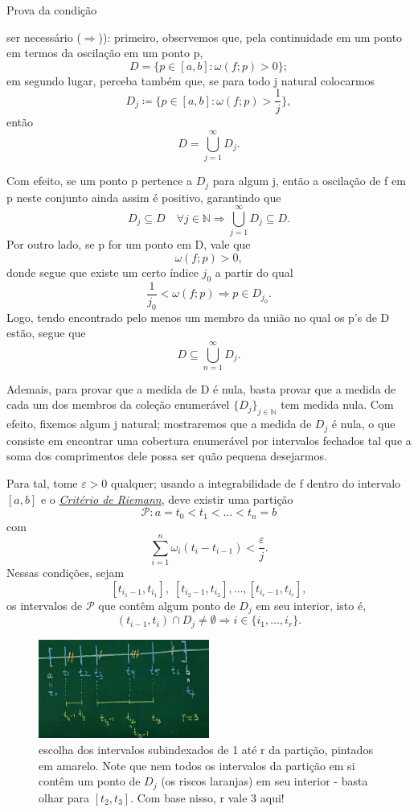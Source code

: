 \documentclass[../analysisII_notes.tex]{subfiles}
\begin{document}
\begin{proof*}
	\hypertarget{next_class_13}{Prova da condição} ser necessário (\(\Rightarrow \))): primeiro, observemos que, pela continuidade em um ponto em termos da oscilação em um ponto p,
	\[
		D = \{p\in [a, b]: \omega(f; p)>0\};
	\]
	em segundo lugar, perceba também que, se para todo j natural colocarmos
	\[
		D_{j} \coloneqq \biggl\{p\in [a, b]: \omega (f; p) > \frac{1}{j}\biggr\},
	\]
	então
	\[
		D = \bigcup_{j=1}^{\infty}D_{j}.
	\]

	Com efeito, se um ponto p pertence a \(D_{j}\) para algum j, então a oscilação de f em p neste conjunto ainda assim é positivo, garantindo que
	\[
		D_{j} \subseteq D \quad \forall j\in \mathbb{N} \Rightarrow \bigcup_{j=1}^{\infty}D_{j} \subseteq D.
	\]
	Por outro lado, se p for um ponto em D, vale que
	\[
		\omega (f; p) > 0,
	\]
	donde segue que existe um certo índice \(j_{0}\) a partir do qual
	\[
		\frac{1}{j_{0}}<\omega (f; p) \Rightarrow p\in D_{j_{0}}.
	\]
	Logo, tendo encontrado pelo menos um membro da união no qual os p's de D estão, segue que
	\[
		D \subseteq \bigcup_{n=1}^{\infty}D_{j}.
	\]

	Ademais, para provar que a medida de D é nula, basta provar que a medida de cada um dos membros da coleção enumerável \(\{D_{j}\}_{j\in \mathbb{N}}\) tem medida nula.
	Com efeito, fixemos algum j natural; mostraremos que a medida de \(D_{j}\) é nula, o que consiste em encontrar uma cobertura enumerável por intervalos fechados tal que a soma dos comprimentos dele possa ser quão pequena desejarmos.

	Para tal, tome \(\varepsilon > 0\) qualquer; usando a integrabilidade de f dentro do intervalo \([a, b]\) e o \hyperlink{integrability_conditions}{\textit{Critério de Riemann}}, deve existir uma partição
	\[
		\mathcal{P}: a = t_{0} < t_1 < \dotsc <t_{n} = b
	\]
	com
	\[
		\sum\limits_{i=1}^{n}\omega_{i}(t_{i}-t_{i-1}) < \frac{\varepsilon }{j}.
	\]
	Nessas condições, sejam
	\[
		[t_{i_{1}-1}, t_{i_{1}}],\; [t_{i_{2}-1}, t_{i_{2}}], \dotsc , [t_{i_{r}-1}, t_{i_{r}}],
	\]
	os intervalos de \(\mathcal{P}\) que contêm algum ponto de \(D_{j}\) em seu interior, isto é,
	\[
		(t_{i-1}, t_{i})\cap D_{j} \neq\emptyset \Rightarrow i\in \{i_{1}, \dotsc , i_{r}\}.
	\]
	\begin{figure}[H]
		\begin{center}
			\includegraphics[height=0.5\textheight, width=0.5\textwidth, keepaspectratio]{./Images/partition_13.png}
		\end{center}
		\caption{escolha dos intervalos subindexados de 1 até r da partição, pintados em amarelo. Note que nem todos os intervalos da partição em si contêm um ponto de \(D_{j}\) (os riscos laranjas) em seu interior - basta olhar para \([t_{2}, t_{3}]\). Com base nisso, r vale 3 aqui!}
		\label{part13}
	\end{figure}


\end{proof*}
\end{document}
